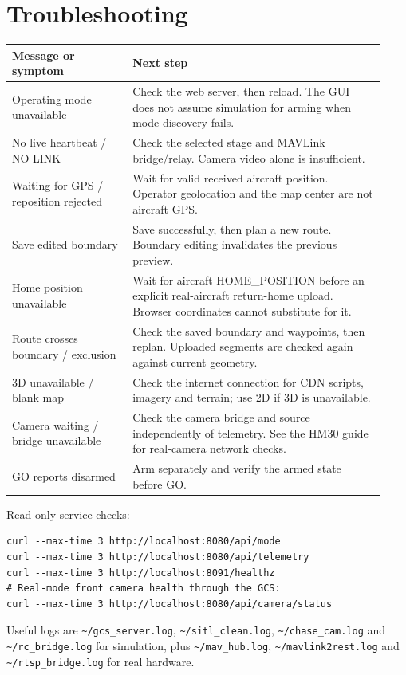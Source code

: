 \documentclass[11pt]{article}
\begin{document}
\section{Troubleshooting}
\begin{longtable}{>{\raggedright\arraybackslash}p{0.30\linewidth} >{\raggedright\arraybackslash}p{0.63\linewidth}}
\textbf{Message or symptom} & \textbf{Next step} \\ \hline
\endhead
Operating mode unavailable & Check the web server, then reload. The GUI does not assume simulation for arming when mode discovery fails. \\
No live heartbeat / NO LINK & Check the selected stage and MAVLink bridge/relay. Camera video alone is insufficient. \\
Waiting for GPS / reposition rejected & Wait for valid received aircraft position. Operator geolocation and the map center are not aircraft GPS. \\
Save edited boundary & Save successfully, then plan a new route. Boundary editing invalidates the previous preview. \\
Home position unavailable & Wait for aircraft HOME\_POSITION before an explicit real-aircraft return-home upload. Browser coordinates cannot substitute for it. \\
Route crosses boundary / exclusion & Check the saved boundary and waypoints, then replan. Uploaded segments are checked again against current geometry. \\
3D unavailable / blank map & Check the internet connection for CDN scripts, imagery and terrain; use 2D if 3D is unavailable. \\
Camera waiting / bridge unavailable & Check the camera bridge and source independently of telemetry. See the HM30 guide for real-camera network checks. \\
GO reports disarmed & Arm separately and verify the armed state before GO. \\
\end{longtable}

Read-only service checks:
\begin{lstlisting}
curl --max-time 3 http://localhost:8080/api/mode
curl --max-time 3 http://localhost:8080/api/telemetry
curl --max-time 3 http://localhost:8091/healthz
# Real-mode front camera health through the GCS:
curl --max-time 3 http://localhost:8080/api/camera/status
\end{lstlisting}
Useful logs are \texttt{\textasciitilde/gcs\_server.log},
\texttt{\textasciitilde/sitl\_clean.log}, \texttt{\textasciitilde/chase\_cam.log}
and \texttt{\textasciitilde/rc\_bridge.log} for simulation, plus
\texttt{\textasciitilde/mav\_hub.log}, \texttt{\textasciitilde/mavlink2rest.log}
and \texttt{\textasciitilde/rtsp\_bridge.log} for real hardware.
\end{document}
